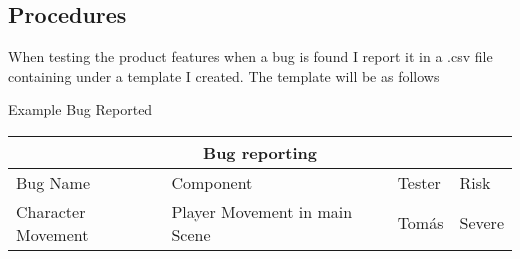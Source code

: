 \subsection{Procedures}


When testing the product features when a bug is found I report it in a  .csv file containing under a template I created. The template will be as follows



\centerline{Example Bug Reported}

\setlength{\arrayrulewidth}{1mm}
\setlength{\tabcolsep}{18pt}
\renewcommand{\arraystretch}{2.5}

\begin{tabular}{ |p{2.5cm}|p{2.5cm}|p{2.5cm}||p{2.5cm}|  }
\hline
\multicolumn{4}{|c|}{Bug reporting  } \\
\hline
Bug Name      & Component  & Tester & Risk \\
\hline
Character Movement   & Player Movement in main Scene & Tomás & Severe \\
\hline

\end{tabular}

